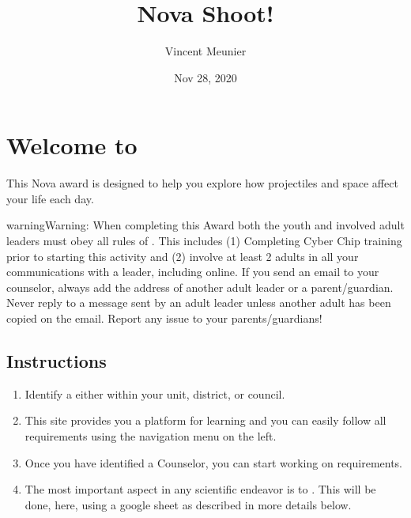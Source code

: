 \documentclass[letterpaper,10pt,english,openany,oneside]{sphinxmanual}
\title{Nova \sphinxhyphen{} Shoot!}
\date{Nov 28, 2020}
\author{Vincent Meunier}
\begin{document}
\pagestyle{empty}
\sphinxmaketitle
\pagestyle{plain}
\sphinxtableofcontents
\pagestyle{normal}
\label{\detokenize{index::doc}}



\chapter{Welcome to }
\label{\detokenize{introduction:welcome-to-shoot}}\label{\detokenize{introduction:introduction}}\label{\detokenize{introduction::doc}}
This Nova award is designed to help you explore how projectiles and space affect your life each day.

\begin{sphinxadmonition}{warning}{Warning:}
When completing this Award both the youth and involved adult leaders must obey all rules of . This includes (1) Completing Cyber Chip training prior to starting this activity and (2)  involve at least 2 adults in all your communications with a leader, including online. If you send an email to your counselor, always add the address of another adult leader or a parent/guardian. Never reply to a message sent by an adult leader unless another adult has been copied on the email. Report any issue to your parents/guardians!
\end{sphinxadmonition}


\section{Instructions}
\label{\detokenize{introduction:instructions}}\begin{enumerate}
%
\item {} 
Identify a  either within your unit, district, or council.

\item {} 
This site provides you a platform for learning and you can easily follow all requirements using the navigation menu on the left.

\item {} 
Once you have identified a Counselor, you can start working on requirements.

\item {} 
The most important aspect in any scientific endeavor is to . This will be done, here, using a google sheet as described in more details below.

\end{enumerate}
\end{document}

